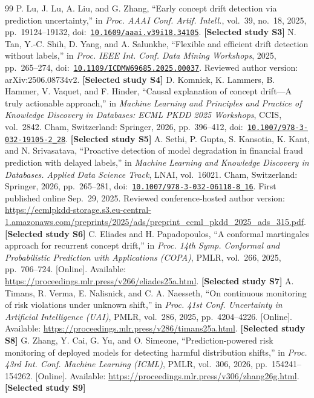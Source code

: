 \documentclass[11pt,a4paper]{article}
\begin{document}
\begin{thebibliography}{99}
 P. Lu, J. Lu, A. Liu, and G. Zhang, ``Early concept drift detection via prediction uncertainty,'' in \emph{Proc. AAAI Conf. Artif. Intell.}, vol.~39, no.~18, 2025, pp.~19124--19132, doi:~\href{https://doi.org/10.1609/aaai.v39i18.34105}{\nolinkurl{10.1609/aaai.v39i18.34105}}. \textbf{[Selected study S3]}
 N. Tan, Y.-C. Shih, D. Yang, and A. Salunkhe, ``Flexible and efficient drift detection without labels,'' in \emph{Proc. IEEE Int. Conf. Data Mining Workshops}, 2025, pp.~265--274, doi:~\href{https://doi.org/10.1109/ICDMW69685.2025.00037}{\nolinkurl{10.1109/ICDMW69685.2025.00037}}. Reviewed author version: arXiv:2506.08734v2. \textbf{[Selected study S4]}
 D. Komnick, K. Lammers, B. Hammer, V. Vaquet, and F. Hinder, ``Causal explanation of concept drift---A truly actionable approach,'' in \emph{Machine Learning and Principles and Practice of Knowledge Discovery in Databases: ECML PKDD 2025 Workshops}, CCIS, vol.~2842. Cham, Switzerland: Springer, 2026, pp.~396--412, doi:~\href{https://doi.org/10.1007/978-3-032-19105-2_28}{\nolinkurl{10.1007/978-3-032-19105-2_28}}. \textbf{[Selected study S5]}
 A. Sethi, P. Gupta, S. Kansotia, K. Kant, and N. Srivasatava, ``Proactive detection of model degradation in financial fraud prediction with delayed labels,'' in \emph{Machine Learning and Knowledge Discovery in Databases. Applied Data Science Track}, LNAI, vol.~16021. Cham, Switzerland: Springer, 2026, pp.~265--281, doi:~\href{https://doi.org/10.1007/978-3-032-06118-8_16}{\nolinkurl{10.1007/978-3-032-06118-8_16}}. First published online Sep.~29, 2025. Reviewed conference-hosted author version: \url{https://ecmlpkdd-storage.s3.eu-central-1.amazonaws.com/preprints/2025/ads/preprint_ecml_pkdd_2025_ads_315.pdf}. \textbf{[Selected study S6]}
 C. Eliades and H. Papadopoulos, ``A conformal martingales approach for recurrent concept drift,'' in \emph{Proc. 14th Symp. Conformal and Probabilistic Prediction with Applications (COPA)}, PMLR, vol.~266, 2025, pp.~706--724. [Online]. Available: \url{https://proceedings.mlr.press/v266/eliades25a.html}. \textbf{[Selected study S7]}
 A. Timans, R. Verma, E. Nalisnick, and C. A. Naesseth, ``On continuous monitoring of risk violations under unknown shift,'' in \emph{Proc. 41st Conf. Uncertainty in Artificial Intelligence (UAI)}, PMLR, vol.~286, 2025, pp.~4204--4226. [Online]. Available: \url{https://proceedings.mlr.press/v286/timans25a.html}. \textbf{[Selected study S8]}
 G. Zhang, Y. Cai, G. Yu, and O. Simeone, ``Prediction-powered risk monitoring of deployed models for detecting harmful distribution shifts,'' in \emph{Proc. 43rd Int. Conf. Machine Learning (ICML)}, PMLR, vol.~306, 2026, pp.~154241--154262. [Online]. Available: \url{https://proceedings.mlr.press/v306/zhang26g.html}. \textbf{[Selected study S9]}

\end{thebibliography}
\end{document}
